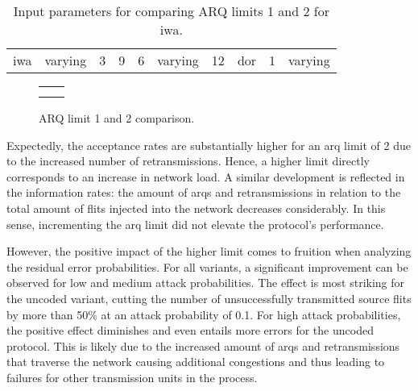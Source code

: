 \begin{table}
    \centering
    \begin{tabulary}{\textwidth}{C|C|C|C|C|C|C|C|C|C}
        \pProtVar{} & \pNCMode{} & \pEncMods{} & \pAuthMods{} & \pRQSize{} & \pARQLimit{} & \pARQTimeout{} & \pRStrat{} & \pAttackerSet{} & \pAttackProb{} \\\hline
        \gls{iwa} & varying & 3 & 9 & 6 & varying & 12 & \gls{dor} & 1 & varying \\
    \end{tabulary}
    \caption[Input parameters for comparing different ARQ limits]{Input parameters for comparing ARQ limits 1 and 2 for \gls{iwa}.}
    \label{tab:setuparqlimits}
\end{table}

\begin{figure}
    \begin{tabular}{cc}
         &  \\
         & 
    \end{tabular}
    \caption[Results for the ARQ limit comparison]{ARQ limit 1 and 2 comparison.}
    \label{fig:resultsarqlimits}
\end{figure}

Expectedly, the acceptance rates are substantially higher for an \gls{arq} limit of 2 due to the increased number of retransmissions. Hence, a higher
limit directly corresponds to an increase in network load. A similar development is reflected in the information rates: the amount of \glspl{arq} and
retransmissions in relation to the total amount of flits injected into the network decreases considerably. In this sense, incrementing the \gls{arq}
limit did not elevate the protocol's performance.

However, the positive impact of the higher limit comes to fruition when analyzing the residual error probabilities. For all variants, a significant
improvement can be observed for low and medium attack probabilities. The effect is most striking for the uncoded variant, cutting the number of
unsuccessfully transmitted source flits by more than 50\% at an attack probability of 0.1. For high attack probabilities, the positive effect
diminishes and even entails more errors for the uncoded protocol. This is likely due to the increased amount of \glspl{arq} and retransmissions
that traverse the network causing additional congestions and thus leading to failures for other transmission units in the process.

